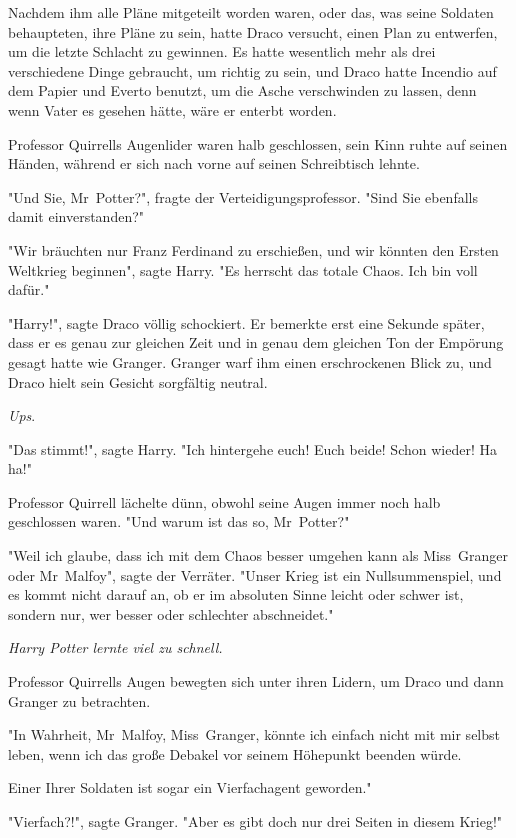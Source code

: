 {Nachdem ihm alle Pläne mitgeteilt worden waren, oder das, was seine Soldaten behaupteten, ihre Pläne zu sein, hatte Draco versucht, einen Plan zu entwerfen, um die letzte Schlacht zu gewinnen. Es hatte wesentlich mehr als drei verschiedene Dinge gebraucht, um richtig zu sein, und Draco hatte Incendio auf dem Papier und Everto benutzt, um die Asche verschwinden zu lassen, denn wenn Vater es gesehen hätte, wäre er enterbt worden.

Professor Quirrells Augenlider waren halb geschlossen, sein Kinn ruhte auf seinen Händen, während er sich nach vorne auf seinen Schreibtisch lehnte.

"Und Sie, Mr~Potter?", fragte der Verteidigungsprofessor. "Sind Sie ebenfalls damit einverstanden?"

"Wir bräuchten nur Franz Ferdinand zu erschießen, und wir könnten den Ersten Weltkrieg beginnen", sagte Harry. "Es herrscht das totale Chaos. Ich bin voll dafür."

"Harry!", sagte Draco völlig schockiert. Er bemerkte erst eine Sekunde später, dass er es genau zur gleichen Zeit und in genau dem gleichen Ton der Empörung gesagt hatte wie Granger. Granger warf ihm einen erschrockenen Blick zu, und Draco hielt sein Gesicht sorgfältig neutral.

\emph{Ups}.

"Das stimmt!", sagte Harry. "Ich hintergehe euch! Euch beide! Schon wieder! Ha ha!"

Professor Quirrell lächelte dünn, obwohl seine Augen immer noch halb geschlossen waren. "Und warum ist das so, Mr~Potter?"

"Weil ich glaube, dass ich mit dem Chaos besser umgehen kann als Miss~Granger oder Mr~Malfoy", sagte der Verräter. "Unser Krieg ist ein Nullsummenspiel, und es kommt nicht darauf an, ob er im absoluten Sinne leicht oder schwer ist, sondern nur, wer besser oder schlechter abschneidet."

\emph{Harry Potter lernte viel zu schnell.}

Professor Quirrells Augen bewegten sich unter ihren Lidern, um Draco und dann Granger zu betrachten.

"In Wahrheit, Mr~Malfoy, Miss~Granger, könnte ich einfach nicht mit mir selbst leben, wenn ich das große Debakel vor seinem Höhepunkt beenden würde.

Einer Ihrer Soldaten ist sogar ein Vierfachagent geworden."

"Vierfach?!", sagte Granger. "Aber es gibt doch nur drei Seiten in diesem Krieg!"

}
